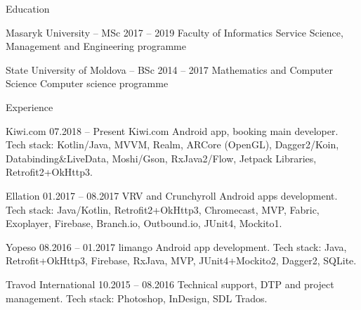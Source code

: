 \documentclass[12pt, a4paper]{article}
\begin{document}
\begin{minipage}[t]{0.6\textwidth}
    Education
    
    \bigskip
    
    Masaryk University – MSc \hfill 2017 – 2019 \newline
    Faculty of Informatics \newline
    Service Science, Management and Engineering programme
    
    \bigskip
    
    State University of Moldova – BSc \hfill 2014 – 2017 \newline
    Mathematics and Computer Science \newline
    Computer science programme
    
    \bigskip
    
    Experience
    
    \bigskip
    
    Kiwi.com \hfill 07.2018 – Present \newline
    Kiwi.com Android app, booking main developer. \newline
    Tech stack: Kotlin/Java, MVVM, Realm, ARCore (OpenGL), \newline
    Dagger2/Koin, Databinding\&LiveData, Moshi/Gson, \newline
    RxJava2/Flow, Jetpack Libraries, Retrofit2+OkHttp3.
    
    \bigskip
    
    Ellation \hfill 01.2017 – 08.2017 \newline
    VRV and Crunchyroll Android apps development. \newline
    Tech stack: Java/Kotlin, Retrofit2+OkHttp3, Chromecast, MVP, \newline
    Fabric, Exoplayer, Firebase, Branch.io, Outbound.io, JUnit4, \newline
    Mockito1.
   
    \bigskip
    
    Yopeso \hfill 08.2016 – 01.2017 \newline
    limango Android app development. \newline
    Tech stack: Java, Retrofit+OkHttp3, Firebase, RxJava, MVP, \newline
    JUnit4+Mockito2, Dagger2, SQLite.
    
    \bigskip
    
    Travod International \hfill 10.2015 – 08.2016 \newline
    Technical support, DTP and project management. \newline
    Tech stack: Photoshop, InDesign, SDL Trados.
    

\end{minipage}
\end{document}
